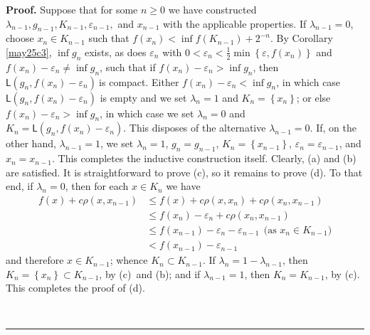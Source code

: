 \documentclass[11pt]{article}%
\newenvironment{proof}[1][Proof]{\noindent\textbf{#1.} }{\ \rule{0.5em}{0.5em}}
\begin{document}
\begin{proof}
\noindent
Suppose that for some $n\geqslant0$ we have constructed $\lambda_{n-1}%
,g_{n-1},K_{n-1},\varepsilon_{n-1},$ and $x_{n-1}$ with the applicable
properties. If $\lambda_{n-1}=0$, choose $x_{n}\in K_{n-1}$ such that
$f(x_{n})<\inf f(K_{n-1})+2^{-n}$. By Corollary \ref{may25c3}, $\inf g_{n}$
exists, as does $\varepsilon_{n}$ with $0<\varepsilon_{n}<\frac{1}{2}%
\min\left\{  \varepsilon,f(x_{n})\right\}  $ and $f(x_{n})-\varepsilon_{n}%
\neq\inf g_{n}$, such that if $f(x_{n})-\varepsilon_{n}>\inf g_{n}$, then
$\mathsf{L}(g_{n},f(x_{n})-\varepsilon_{n})\ $is compact. Either
$f(x_{n})-\varepsilon_{n}<\inf g_{n}$, in which case $\mathsf{L}(g_{n}%
,f(x_{n})-\varepsilon_{n})$ is empty and we set $\lambda_{n}=1$ and
$K_{n}=\left\{  x_{n}\right\}  $; or else $f(x_{n})-\varepsilon_{n}>\inf
g_{n}$, in which case we set $\lambda_{n}=0$ and $K_{n}=\mathsf{L}%
(g_{n},f(x_{n})-\varepsilon_{n})$. This disposes of the alternative
$\lambda_{n-1}=0$. If, on the other hand, $\lambda_{n-1}=1$, we set
$\lambda_{n}=1$, $g_{n}=g_{n-1}$, $K_{n}=\left\{  x_{n-1}\right\}  $,
$\varepsilon_{n}=\varepsilon_{n-1}$, and $x_{n}=x_{n-1}$. This completes the
inductive construction itself. Clearly, (a) and (b) are satisfied. It is
straightforward to prove (c), so it remains to prove (d). To that end, if
$\lambda_{n}=0$, then for each $x\in K_{n}$ we have
\begin{align*}
f\left(  x\right)  +c\rho\left(  x,x_{n-1}\right)   &  \leqslant f\left(
x\right)  +c\rho\left(  x,x_{n}\right)  +c\rho\left(  x_{n},x_{n-1}\right) \\
&  \leqslant f\left(  x_{n}\right)  -\varepsilon_{n}+c\rho\left(
x_{n},x_{n-1}\right) \\
&  \leqslant f\left(  x_{n-1}\right)  -\varepsilon_{n}-\varepsilon
_{n-1}\ \ \text{(as }x_{n}\in K_{n-1}\text{)}\\
&  <f\left(  x_{n-1}\right)  -\varepsilon_{n-1}%
\end{align*}
and therefore $x\in K_{n-1}$; whence $K_{n}\subset K_{n-1}$. If $\lambda
_{n}=1-\lambda_{n-1}$, then $K_{n}=\left\{  x_{n}\right\}  \subset K_{n-1}$,
by (c)~and (b); and if $\lambda_{n-1}=1$, then $K_{n}=K_{n-1}$, by (c). This
completes the proof of (d).


\end{proof}
\end{document}
